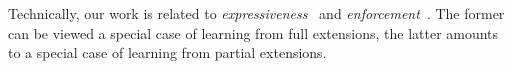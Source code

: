 \documentclass[letterpaper]{article} %
\newcommand{\setS}{\mathbb{S}}
\begin{document}



Technically, our work is related to \emph{expressiveness}~\cite{DunneDLW15,BertholdRU23} and \emph{enforcement}~\cite{Baumann12,BorgB21,RapbergerU23,WallnerNJ16}. 
The former can be viewed a special case of learning from full extensions, the latter amounts to 
a special case of learning from partial extensions.







\end{document}
